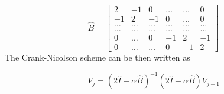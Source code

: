 \documentclass[a4paper, twoside, 11pt]{report}
\theoremstyle{theorem}
\theoremstyle{remark}
\theoremstyle{exemple}
\begin{document}
                    \begin{equation*}
                        \hat{B} =\left[\begin{matrix}
                                     2 & -1 & 0 & \dots & \dots & 0 \\
                                     -1 & 2 & -1 & 0 & \dots & 0 \\
                                     \dots & \dots & \dots & \dots & \dots & \dots\\
                                     \dots & \dots & \dots & \dots & \dots & \dots\\
                                     0 & \dots & 0 & -1 & 2 & -1 \\
                                     0 & \dots & \dots & 0 & -1 & 2
                                      \end{matrix} \right]
                    \end{equation*}
                    The Crank-Nicolson scheme can be then written as

                    \begin{equation*}
                        V_j = (2\hat{I}+\alpha \hat{B})^{-1}(2\hat{I}-\alpha \hat{B})V_{j-1}
                    \end{equation*}
\end{document}
